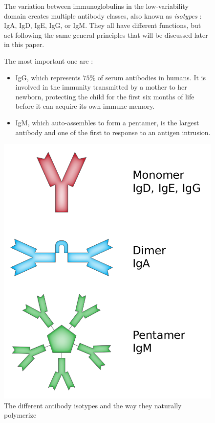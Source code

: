 \begin{figure}[H]
    \begin{minipage}{0.6\textwidth}
        The variation between immunoglobulins in the low-variability domain
        creates multiple antibody classes, also known as \emph{isotypes} :
        IgA, IgD, IgE, IgG, or IgM. They all have different functions, but act
        following the same general principles that will be discussed later in this paper.

        The most important one are :
        \begin{itemize}[leftmargin=*]
            \item IgG, which represents $75\%$ of serum antibodies
            in humans. It is involved in the immunity transmitted by a mother
            to her newborn, protecting the child for the first six months of life
            before it can acquire its own immune memory.
            \item IgM, which auto-assembles to form a pentamer, is the largest
            antibody and one of the first to response to an antigen intrusion.
        \end{itemize}
    \end{minipage}\hfill
    \begin{minipage}{0.35\textwidth}
        \centering
        \includegraphics[width=\textwidth]{../Images/antibody_classes.png}   
        \caption{The different antibody isotypes and the way they naturally polymerize}
        \label{fig:antibody_classes}
    \end{minipage}
\end{figure}
